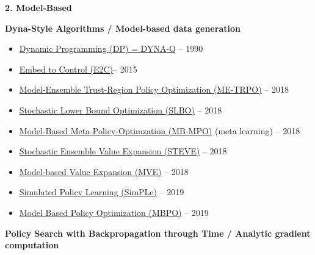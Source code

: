 \documentclass[
  a4paper,
  DIV=11,
  numbers=noendperiod]{scrreprt}
\providecommand{\tightlist}{%
  \setlength{\itemsep}{0pt}\setlength{\parskip}{0pt}}\usepackage{longtable,booktabs,array}
\begin{document}
\textbf{2. Model-Based}

\textbf{Dyna-Style Algorithms / Model-based data generation}

\begin{itemize}
\tightlist
\item
  \href{http://citeseerx.ist.psu.edu/viewdoc/download?doi=10.1.1.51.7362&rep=rep1&type=pdf}{Dynamic
  Programming (DP) = DYNA-Q} -- 1990
\item
  \href{https://arxiv.org/abs/1506.07365}{Embed to Control (E2C)}-- 2015
\item
  \href{https://arxiv.org/abs/1802.10592}{Model-Ensemble Trust-Region
  Policy Optimization (ME-TRPO)} -- 2018
\item
  \href{https://arxiv.org/abs/1807.03858}{Stochastic Lower Bound
  Optimization (SLBO)} -- 2018
\item
  \href{https://arxiv.org/abs/1809.05214}{Model-Based
  Meta-Policy-Optimzation (MB-MPO)} (meta learning) -- 2018
\item
  \href{https://arxiv.org/abs/1803.00101}{Stochastic Ensemble Value
  Expansion (STEVE)} -- 2018
\item
  \href{https://arxiv.org/abs/1803.00101}{Model-based Value Expansion
  (MVE)} -- 2018
\item
  \href{https://arxiv.org/abs/1903.00374}{Simulated Policy Learning
  (SimPLe)} -- 2019
\item
  \href{https://arxiv.org/abs/1906.08253}{Model Based Policy
  Optimization (MBPO)} -- 2019
\end{itemize}

\textbf{Policy Search with Backpropagation through Time / Analytic
gradient computation}
\end{document}
